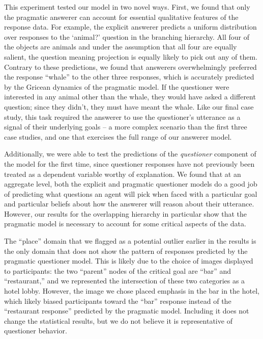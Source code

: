 \documentclass[12pt, floatsintext, jou]{apa6}
\begin{document}
This experiment tested our model in two novel ways. First, we found that only the pragmatic answerer can account for essential qualitative features of the response data. For example, the explicit answerer predicts a uniform distribution over responses to the `animal?' question in the branching hierarchy. All four of the objects are animals and under the assumption that all four are equally salient, the question meaning projection is equally likely to pick out any of them. Contrary to these predictions, we found that answerers overwhelmingly preferred the response ``whale'' to the other three responses, which is accurately predicted by the Gricean dynamics of the pragmatic model. If the questioner were interested in any animal other than the whale, they would have asked a different question; since they didn't, they must have meant the whale. Like our final case study, this task required the answerer to use the questioner's utterance as a signal of their underlying goals -- a more complex scenario than the first three case studies, and one that exercises the full range of our answerer model. 

Additionally, we were able to test the predictions of the \emph{questioner} component of the model for the first time, since questioner responses have not previously been treated as a dependent variable worthy of explanation. We found that at an aggregate level, both the explicit and pragmatic questioner models do a good job of predicting what questions an agent will pick when faced with a particular goal and particular beliefs about how the answerer will reason about their utterance. However, our results for the overlapping hierarchy in particular show that the pragmatic model is necessary to account for some critical aspects of the data. 

The ``place'' domain that we flagged as a potential outlier earlier in the results is the only domain that does not show the pattern of responses predicted by the pragmatic questioner model. This is likely due to the choice of images displayed to participants: the two ``parent'' nodes of the critical goal are ``bar'' and ``restaurant,'' and we represented the intersection of these two categories as a hotel lobby. However, the image we chose placed emphasis in the bar in the hotel, which likely biased participants toward the ``bar'' response instead of the ``restaurant response'' predicted by the pragmatic model. Including it does not change the statistical results, but we do not believe it is representative of questioner behavior. 
\end{document}
